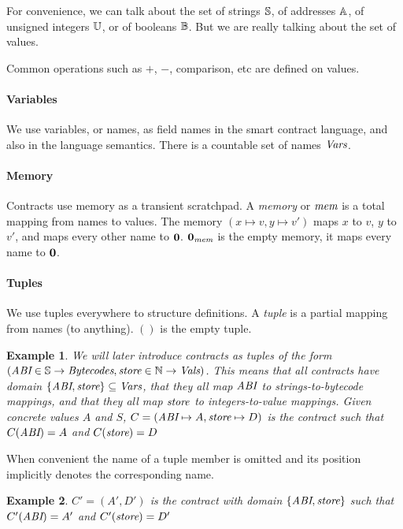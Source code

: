 \documentclass[12pt]{extarticle}
\newtheorem{example}{Example}
\begin{document}
For convenience, we can talk about the set of strings $\mathbb{S}$, of addresses $\mathbb{A}$, of unsigned integers $\mathbb{U}$, or of booleans $\mathbb{B}$. But we are really talking about the set of values.

Common operations such as $+$, $-$, comparison, etc are defined on values.

\paragraph{Variables}
We use variables, or names, as field names in the smart contract language, and also in the language semantics. There is a countable set of names $\textit{Vars}$. 

\paragraph{Memory}
Contracts use memory as a transient scratchpad.
A \emph{memory} or $\textit{mem}$ is a total mapping from names to values. The memory $(x\mapsto v,y\mapsto v')$ maps $x$ to $v$, $y$ to $v'$, and maps every other name to $\mathbf{0}$. $\mathbf{0}_{\textit{mem}}$ is the empty memory, it maps every name to $\mathbf{0}$.

\paragraph{Tuples}
We use tuples everywhere to structure definitions. A \emph{tuple} is a partial mapping from names (to anything). $()$ is the empty tuple.

\begin{example}
We will later introduce \emph{contracts} as tuples of the form $(\textit{ABI}\in\mathbb{S}\rightarrow\textit{Bytecodes},\textit{store}\in\mathbb{N}\rightarrow\textit{Vals})$. 
This means that all contracts have domain $\left\{\textit{ABI},\textit{store}\right\}\subseteq\textit{Vars}$, that they all map $\textit{ABI}$ to strings-to-bytecode mappings, and that they all map $\textit{store}$ to integers-to-value mappings.
Given concrete values $A$ and $S$, $C = (\textit{ABI}\mapsto A,\textit{store}\mapsto D)$ is the contract such that $C(\textit{ABI}) = A$ and $C(\textit{store}) = D$
\end{example}

When convenient the name of a tuple member is omitted and its position implicitly denotes the corresponding name. 
\begin{example}
$C' = (A',D')$ is the contract with domain $\left\{\textit{ABI},\textit{store}\right\}$ such that $C'(\textit{ABI}) = A'$ and $C'(\textit{store}) = D'$
\end{example}
\end{document}
